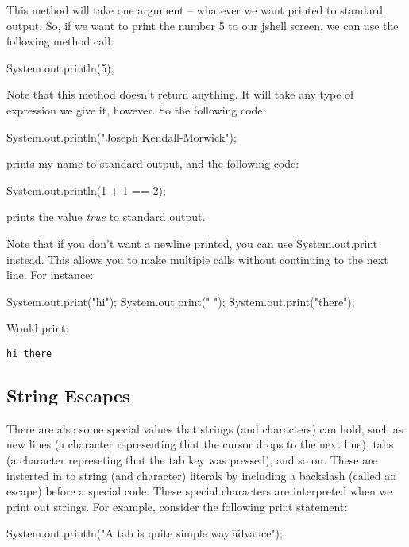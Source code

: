This method will take one argument -- whatever we want printed to standard output. So, if we want to print the number 5 to our jshell screen, we can use the following method call:

\begin{code}
System.out.println(5);
\end{code}

Note that this method doesn't return anything. It will take any type of expression we give it, however. So the following code:

\begin{code}
System.out.println("Joseph Kendall-Morwick");
\end{code}

prints my name to standard output, and the following code:

\begin{code}
System.out.println(1 + 1 == 2);
\end{code}

prints the value \textit{true} to standard output.  

Note that if you don't want a newline printed, you can use System.out.print instead. This allows you to make multiple calls without continuing to the next line. For instance:
\begin{code}
System.out.print("hi");
System.out.print(" ");
System.out.print("there");
\end{code}

Would print:

\begin{verbatim}
hi there
\end{verbatim}


\subsection{String Escapes}


There are also some special values that strings (and characters) can hold, such as new lines (a character representing that the cursor drops to the next line), tabs (a character represeting that the tab key was pressed), and so on. These are insterted in to string (and character) literals by including a backslash (called an escape) before a special code. These special characters are interpreted when we print out strings. For example, consider the following print statement:

\begin{code}
System.out.println("A tab is \n\ta quite simple way \n\t\tto advance");
\end{code}


